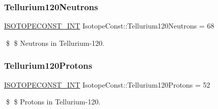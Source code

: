 \subsubsection{\texorpdfstring{Tellurium120\+Neutrons}{Tellurium120Neutrons}}
{\footnotesize\ttfamily \mbox{\hyperlink{group___isotope_const-_macros_ga5f18360b3e99483a35c32d789e62621c}{I\+S\+O\+T\+O\+P\+E\+C\+O\+N\+S\+T\+\_\+\+I\+NT}} Isotope\+Const\+::\+Tellurium120\+Neutrons = 68}

\$ \$ Neutrons in Tellurium-\/120. \mbox{\label{group___isotope_const-_tellurium-_te120_ga1dd21be578a1960b402557f373e49c89}} 
\subsubsection{\texorpdfstring{Tellurium120\+Protons}{Tellurium120Protons}}
{\footnotesize\ttfamily \mbox{\hyperlink{group___isotope_const-_macros_ga5f18360b3e99483a35c32d789e62621c}{I\+S\+O\+T\+O\+P\+E\+C\+O\+N\+S\+T\+\_\+\+I\+NT}} Isotope\+Const\+::\+Tellurium120\+Protons = 52}

\$ \$ Protons in Tellurium-\/120. 